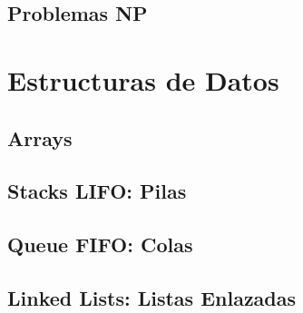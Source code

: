 \documentclass[12pt, fleqn]{report}                             %
\theoremstyle{break}                                            %
\begin{document}
    \chapter{Problemas NP}


\part{Estructuras de Datos}

    \clearpage
    \chapter{Arrays}

    \clearpage
    \chapter{Stacks LIFO: Pilas}

    \clearpage
    \chapter{Queue FIFO: Colas}

    \clearpage
    \chapter{Linked Lists: Listas Enlazadas}
\end{document}
